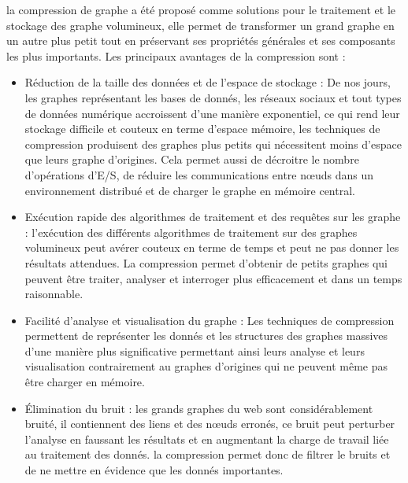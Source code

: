 la compression de graphe a été proposé comme solutions pour le traitement et le stockage des graphe volumineux, elle permet de transformer un grand graphe en un autre plus petit tout en préservant ses propriétés générales et ses composants les plus importants.
Les principaux avantages de la compression sont  \citep{liu2018graph} :
\begin{itemize}

\item Réduction de la taille des données et de l'espace de stockage : De nos jours, les graphes représentant les bases de donnés, les réseaux sociaux et tout types de données numérique accroissent d'une manière exponentiel, ce qui rend leur stockage difficile et couteux en terme d'espace mémoire, les techniques de compression produisent des graphes plus petits qui nécessitent moins d'espace que leurs graphe d'origines. Cela permet aussi de décroitre le nombre d'opérations d'E/S, de réduire les communications entre nœuds dans un environnement distribué et de charger le graphe en mémoire central.   

\item Exécution rapide des algorithmes de traitement et des requêtes sur les graphe : l'exécution des différents algorithmes de traitement sur des graphes volumineux peut avérer couteux en terme de temps et peut ne pas donner les résultats attendues. La compression permet d'obtenir de petits graphes qui peuvent être traiter, analyser et interroger plus efficacement et dans un temps raisonnable. 
  
\item Facilité d'analyse et visualisation du graphe : Les techniques de compression permettent de représenter les donnés et les structures des graphes massives d'une manière plus significative permettant ainsi leurs analyse et leurs visualisation contrairement au graphes d'origines qui ne peuvent même pas être charger en mémoire.  

\item Élimination du bruit : les grands graphes du web sont considérablement bruité, il contiennent des liens et des nœuds erronés, ce bruit peut perturber l'analyse en faussant les résultats et en augmentant la charge de travail liée au traitement des donnés. la compression permet donc de filtrer le bruits et de ne mettre en évidence que les donnés importantes.

\end{itemize}


